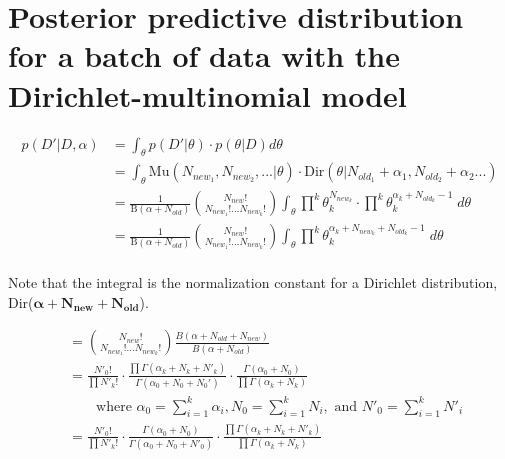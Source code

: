 \documentclass{article}
\begin{document}
\section{Posterior predictive distribution for a batch of data with
the Dirichlet-multinomial model}
\label{3.13}

\begin{align*}
  p(D'|D,\alpha) &= \int_\theta p(D'|\theta) \cdot p(\theta|D) d\theta
  \\
                 &= \int_\theta \text{Mu}(N_{new_1}, N_{new_2},...|\theta) \cdot
                   \text{Dir}(\theta|N_{old_1} + \alpha_1, N_{old_2} + \alpha_2 ...)
  \\
                 &= \frac{1}{\text{B}(\alpha + N_{old})} {N_{new}!
                   \choose N_{new_1}! ... N_{new_k}!} \int_{\theta}
                   \prod^k \theta_k^{N_{new_k}} \cdot \prod^k
                   \theta_k^{\alpha_k + N_{old_k}
                   - 1} \; d\theta \\
                 &= \frac{1}{\text{B}(\alpha + N_{old})} {N_{new}!
                   \choose N_{new_1}! ... N_{new_k}!} \int_{\theta} 
                   \prod^k \theta_k^{\alpha_k + N_{new_k} + N_{old_k}
                   - 1} \; d\theta \\
\end{align*}

Note that the integral is the normalization constant for a Dirichlet
distribution, Dir($\mathbf{\alpha} + \mathbf{N_{new}} + \mathbf{N_{old}}$).

\begin{align*}
                 &= {N_{new}! \choose N_{new_1}! ... N_{new_k}!}
                   \frac{B(\alpha + N_{old} + N_{new})}{B(\alpha +
                   N_{old})} \\
                 &= \frac{N'_0!}{\prod N'_k!} \cdot \frac{\prod
                   \Gamma(\alpha_k + N_k + N'_k)}{\Gamma(\alpha_0 + N_0
                   + N_0')} \cdot \frac{\Gamma(\alpha_0 + N_0)}{\prod
                   \Gamma(\alpha_k + N_k)} \\
                 &\qquad \text{where $\alpha_0 = \sum_{i=1}^k \alpha_i, N_0 = \sum_{i=1}^k
                   N_i, \text{ and } N'_0 = \sum_{i=1}^k N'_i$} \\
                 &= \frac{N'_0!}{\prod N'_k!} \cdot \frac{\Gamma(\alpha_0 +
                   N_0)}{\Gamma(\alpha_0 + N_0 + N'_0)} \cdot
                   \frac{\prod \Gamma(\alpha_k + N_k + N'_k)}{\prod
                   \Gamma(\alpha_k + N_k)}
\end{align*}
\end{document}
